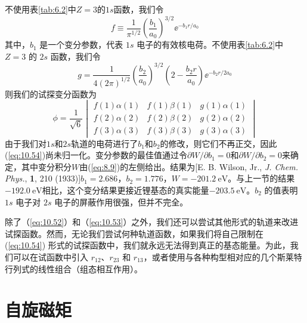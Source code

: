     不使用表\ref{tab:6.2}中$Z=3$的$1s$函数，我们令
    \begin{equation}
        f \equiv \frac{1}{\pi^{1/2}}\left(\frac{b_1}{a_0}\right)^{3/2} \ee ^{-b_1r/a_0}
        \label{eq:10.52}
    \end{equation}
    其中，$b_1$ 是一个变分参数，代表 $1s$ 电子的有效核电荷。不使用表\ref{tab:6.2}中 $Z=3$ 的 $2s$ 函数，我们令
    \begin{equation}
        g = \frac{1}{4\left(2\pi\right)^{1/2}} \left( \frac{b_2}{a_0} \right)^{3/2} \left( 2 - \frac{b_2 r}{a_0} \right) \ee ^{-b_2 r/2a_0}
        \label{eq:10.53}
    \end{equation}
    则我们的试探变分函数为
    \begin{equation}
        \phi = \frac{1}{\sqrt{6}} \begin{vmatrix}
            f\left(1\right)\alpha\left(1\right) & f\left(1\right)\beta\left(1\right) & g\left(1\right)\alpha\left(1\right) \\
            f\left(2\right)\alpha\left(2\right) & f\left(2\right)\beta\left(2\right) & g\left(2\right)\alpha\left(2\right) \\
            f\left(3\right)\alpha\left(3\right) & f\left(3\right)\beta\left(3\right) & g\left(3\right)\alpha\left(3\right)
        \end{vmatrix}
        \label{eq:10.54}
    \end{equation}
    由于我们对$1s$和$2s$轨道的电荷进行了$b_1$和$b_2$的修改，则它们不再正交，因此(\ref{eq:10.54})尚未归一化。变分参数的最佳值通过令$\partial W / \partial b_1 = 0$和$\partial W / \partial b_2 = 0$来确定，其中变分积分$W$由(\ref{eq:8.9})的左侧给出。结果为[E. B. Wilson, Jr., \textit{J. Chem. Phys.}, \textbf{1}, 210 (1933)]$b_1 = 2.686$，$b_2 = 1.776$，$W = -201.2 \: \mathrm{eV}$。与上一节的结果$-192.0 \: \mathrm{eV}$相比，这个变分结果更接近锂基态的真实能量$-203.5 \: \mathrm{eV}$。$b_2$ 的值表明 $1s$ 电子对 $2s$ 电子的屏蔽作用很强，但并不完全。

    除了（\ref{eq:10.52}）和（\ref{eq:10.53}）之外，我们还可以尝试其他形式的轨道来改进试探函数。然而，无论我们尝试何种轨道函数，如果我们将自己限制在 (\ref{eq:10.54}) 形式的试探函数中，我们就永远无法得到真正的基态能量。为此，我们可以在试函数中引入 $r_{12}$、$r_{23}$ 和 $r_{13}$，或者使用与各种构型相对应的几个斯莱特行列式的线性组合（组态相互作用）。

\section{自旋磁矩}
\label{sec:10.9 Spin Magnetic Moment}

